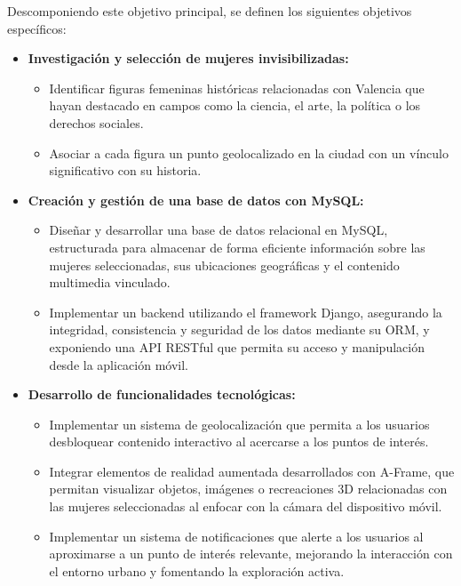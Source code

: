 Descomponiendo este objetivo principal, se definen los siguientes objetivos específicos:

\begin{itemize}
    \item \textbf{Investigación y selección de mujeres invisibilizadas:}
    \begin{itemize}
        \item Identificar figuras femeninas históricas relacionadas con Valencia que hayan destacado en campos como la ciencia, el arte, la política o los derechos sociales.
        \item Asociar a cada figura un punto geolocalizado en la ciudad con un vínculo significativo con su historia.
    \end{itemize}

    \item \textbf{Creación y gestión de una base de datos con MySQL:}
    \begin{itemize}
        \item Diseñar y desarrollar una base de datos relacional en MySQL, estructurada para almacenar de forma eficiente información sobre las mujeres seleccionadas, sus ubicaciones geográficas y el contenido multimedia vinculado.
        \item Implementar un backend utilizando el framework Django, asegurando la integridad, consistencia y seguridad de los datos mediante su ORM, y exponiendo una API RESTful que permita su acceso y manipulación desde la aplicación móvil.
    \end{itemize}


    \item \textbf{Desarrollo de funcionalidades tecnológicas:}
    \begin{itemize}
        \item Implementar un sistema de geolocalización que permita a los usuarios desbloquear contenido interactivo al acercarse a los puntos de interés.
        \item Integrar elementos de realidad aumentada desarrollados con A-Frame, que permitan visualizar objetos, imágenes o recreaciones 3D relacionadas con las mujeres seleccionadas al enfocar con la cámara del dispositivo móvil.
        \item Implementar un sistema de notificaciones que alerte a los usuarios al aproximarse a un punto de interés relevante, mejorando la interacción con el entorno urbano y fomentando la exploración activa.
    \end{itemize}


\end{itemize}
